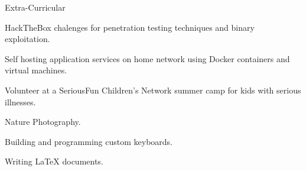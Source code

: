 \documentclass{resume} %
\begin{document}
\begin{rSection}{Extra-Curricular} \itemsep -3pt
	\item HackTheBox chalenges for penetration testing techniques and binary exploitation.
	\item Self hosting application services on home network using Docker containers and virtual machines.
	\item Volunteer at a SeriousFun Children's Network summer camp for kids with serious illnesses.
	\item Nature Photography.
	\item Building and programming custom keyboards.
	\item Writing LaTeX documents.
\end{rSection}

\end{document}
